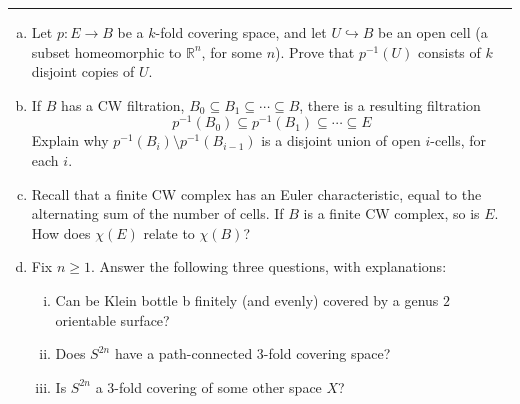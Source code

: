 \documentclass[letterpaper, 12pt]{article}
\begin{document}
\noindent\rule{7in}{2.8pt}
\begin{problem}{4}
\begin{enumerate}[(a)]
\item Let \(p:E\rightarrow B\) be a \(k\)-fold covering space, and let \(U\hookrightarrow B\) be an open cell (a subset homeomorphic to \(\mathbb{R}^n\), for some \(n\)). Prove that \(p^{-1}(U)\) consists of \(k\) disjoint copies of \(U\). 
\item  If \(B\) has a CW filtration, \(B_0\subseteq B_1\subseteq \cdots \subseteq B\), there is a resulting filtration 
\[p^{-1}(B_0)\subseteq p^{-1}(B_1)\subseteq \cdots \subseteq E\]
Explain why \(p^{-1}(B_i)\setminus p^{-1}(B_{i-1})\) is a disjoint union of open \(i\)-cells, for each \(i\). 
\item Recall that a finite CW complex has an Euler characteristic, equal to the alternating sum of the number of cells. If \(B\) is a finite CW complex, so is \(E\). How does 
\(\chi(E)\) relate to \(\chi(B)\)? 
\item Fix \(n\geq 1\). Answer the following three questions, with explanations: 
\begin{enumerate}[i.]
\item Can be Klein bottle b finitely (and evenly) covered by a genus \(2\) orientable surface? 
\item Does \(S^{2n}\) have a path-connected \(3\)-fold covering space? 
\item Is \(S^{2n}\) a \(3\)-fold covering of some other space \(X\)?
\end{enumerate} 
\end{enumerate}
\end{problem}
\end{document}
